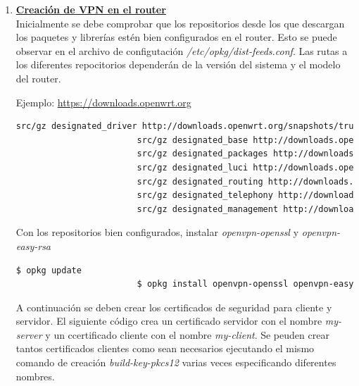 \documentclass[12pt]{article}
\begin{document}
            \begin{enumerate}
                \item \textbf{\underline{Creación de VPN en el router}} \\
                    Inicialmente se debe comprobar que los repositorios desde los que descargan los paquetes y librerías estén bien configurados en el router. Esto se puede observar en el archivo de configutación \textit{/etc/opkg/dist-feeds.conf}. Las rutas a los diferentes repocitorios dependerán de la versión del sistema y el modelo del router.

                    Ejemplo:
                    \url{https://downloads.openwrt.org}

                    \begin{lstlisting}[language=bash]
                        src/gz designated_driver http://downloads.openwrt.org/snapshots/trunk/brcm63xx/smp/packages/packages
                        src/gz designated_base http://downloads.openwrt.org/snapshots/trunk/brcm63xx/smp/packages/base
                        src/gz designated_packages http://downloads.openwrt.org/snapshots/trunk/brcm63xx/smp/packages/packages
                        src/gz designated_luci http://downloads.openwrt.org/snapshots/trunk/brcm63xx/smp/packages/luci
                        src/gz designated_routing http://downloads.openwrt.org/snapshots/trunk/brcm63xx/smp/packages/routing
                        src/gz designated_telephony http://downloads.openwrt.org/snapshots/trunk/brcm63xx/smp/packages/telephony
                        src/gz designated_management http://downloads.openwrt.org/snapshots/trunk/brcm63xx/smp/packages/management
                    \end{lstlisting}
                    
                    Con los repositorios bien configurados, instalar \textit{openvpn-openssl} y \textit{openvpn-easy-rsa}
                    
                    \begin{lstlisting}[language=bash]
                        $ opkg update
                        $ opkg install openvpn-openssl openvpn-easy-rsa
                    \end{lstlisting}

                    A continuación se deben crear los certificados de seguridad para cliente y servidor. El siguiente código crea un certificado servidor con el nombre \textit{my-server} y un ccertificado cliente con el nombre \textit{my-client}. Se peuden crear tantos certificados clientes como sean necesarios ejecutando el mismo comando de creación \textit{build-key-pkcs12} varias veces especificando diferentes nombres.


\end{enumerate}
\end{document}
